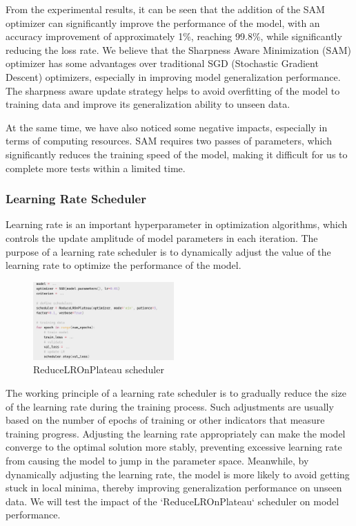 \documentclass[twocolumn]{article}
\begin{document}
    From the experimental results, it can be seen that the addition of the SAM optimizer can significantly improve the performance of the model, with an accuracy improvement of approximately 1\%, reaching 99.8\%, while significantly reducing the loss rate. We believe that the Sharpness Aware Minimization (SAM) optimizer has some advantages over traditional SGD (Stochastic Gradient Descent) optimizers, especially in improving model generalization performance. The sharpness aware update strategy helps to avoid overfitting of the model to training data and improve its generalization ability to unseen data.

    At the same time, we have also noticed some negative impacts, especially in terms of computing resources. SAM requires two passes of parameters, which significantly reduces the training speed of the model, making it difficult for us to complete more tests within a limited time.

    \subsubsection{Learning Rate Scheduler} 
    
    Learning rate is an important hyperparameter in optimization algorithms, which controls the update amplitude of model parameters in each iteration. The purpose of a learning rate scheduler is to dynamically adjust the value of the learning rate to optimize the performance of the model.

    \begin{figure}[ht]
        \centering
        \includegraphics[width=0.48\textwidth]{scheduler.png}
        \caption{ReduceLROnPlateau scheduler}
        \label{fig:scheduler}
    \end{figure}


    The working principle of a learning rate scheduler is to gradually reduce the size of the learning rate during the training process. Such adjustments are usually based on the number of epochs of training or other indicators that measure training progress. Adjusting the learning rate appropriately can make the model converge to the optimal solution more stably, preventing excessive learning rate from causing the model to jump in the parameter space. Meanwhile, by dynamically adjusting the learning rate, the model is more likely to avoid getting stuck in local minima, thereby improving generalization performance on unseen data. We will test the impact of the `ReduceLROnPlateau` scheduler on model performance.
\end{document}
